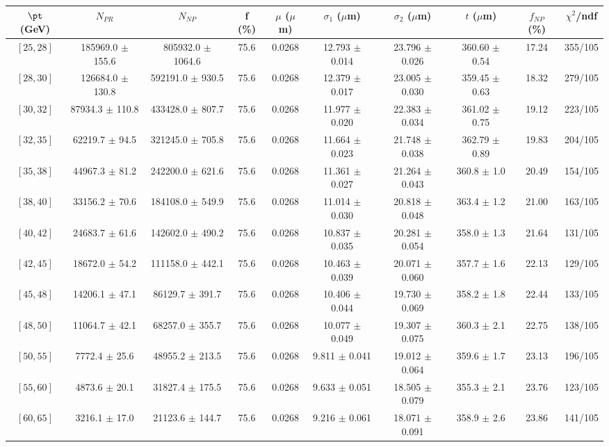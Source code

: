 \begin{tabular}{c||c|c|c|c|c|c|c||c|c}
$\pt$ (GeV) & $N_{PR}$ & $N_{NP}$ & f (\%) & $\mu$ ($\mu$m) & $\sigma_1$ ($\mu$m) & $\sigma_2$ ($\mu$m)  & $t$ ($\mu$m) & $f_{NP}$ (\%) & $\chi^2$/ndf \\
\hline
$[25, 28]$ & 185969.0 $\pm$ 155.6 & 805932.0 $\pm$ 1064.6 & 75.6 & 0.0268 & 12.793 $\pm$ 0.014 & 23.796 $\pm$ 0.026 & 360.60 $\pm$ 0.54 & 17.24 & 355/105\\
$[28, 30]$ & 126684.0 $\pm$ 130.8 & 592191.0 $\pm$ 930.5 & 75.6 & 0.0268 & 12.379 $\pm$ 0.017 & 23.005 $\pm$ 0.030 & 359.45 $\pm$ 0.63 & 18.32 & 279/105\\
$[30, 32]$ & 87934.3 $\pm$ 110.8 & 433428.0 $\pm$ 807.7 & 75.6 & 0.0268 & 11.977 $\pm$ 0.020 & 22.383 $\pm$ 0.034 & 361.02 $\pm$ 0.75 & 19.12 & 223/105\\
$[32, 35]$ & 62219.7 $\pm$ 94.5 & 321245.0 $\pm$ 705.8 & 75.6 & 0.0268 & 11.664 $\pm$ 0.023 & 21.748 $\pm$ 0.038 & 362.79 $\pm$ 0.89 & 19.83 & 204/105\\
$[35, 38]$ & 44967.3 $\pm$ 81.2 & 242200.0 $\pm$ 621.6 & 75.6 & 0.0268 & 11.361 $\pm$ 0.027 & 21.264 $\pm$ 0.043 & 360.8 $\pm$ 1.0 & 20.49 & 154/105\\
$[38, 40]$ & 33156.2 $\pm$ 70.6 & 184108.0 $\pm$ 549.9 & 75.6 & 0.0268 & 11.014 $\pm$ 0.030 & 20.818 $\pm$ 0.048 & 363.4 $\pm$ 1.2 & 21.00 & 163/105\\
$[40, 42]$ & 24683.7 $\pm$ 61.6 & 142602.0 $\pm$ 490.2 & 75.6 & 0.0268 & 10.837 $\pm$ 0.035 & 20.281 $\pm$ 0.054 & 358.0 $\pm$ 1.3 & 21.64 & 131/105\\
$[42, 45]$ & 18672.0 $\pm$ 54.2 & 111158.0 $\pm$ 442.1 & 75.6 & 0.0268 & 10.463 $\pm$ 0.039 & 20.071 $\pm$ 0.060 & 357.7 $\pm$ 1.6 & 22.13 & 129/105\\
$[45, 48]$ & 14206.1 $\pm$ 47.1 & 86129.7 $\pm$ 391.7 & 75.6 & 0.0268 & 10.406 $\pm$ 0.044 & 19.730 $\pm$ 0.069 & 358.2 $\pm$ 1.8 & 22.44 & 133/105\\
$[48, 50]$ & 11064.7 $\pm$ 42.1 & 68257.0 $\pm$ 355.7 & 75.6 & 0.0268 & 10.077 $\pm$ 0.049 & 19.307 $\pm$ 0.075 & 360.3 $\pm$ 2.1 & 22.75 & 138/105\\
$[50, 55]$ & 7772.4 $\pm$ 25.6 & 48955.2 $\pm$ 213.5 & 75.6 & 0.0268 & 9.811 $\pm$ 0.041 & 19.012 $\pm$ 0.064 & 359.6 $\pm$ 1.7 & 23.13 & 196/105\\
$[55, 60]$ & 4873.6 $\pm$ 20.1 & 31827.4 $\pm$ 175.5 & 75.6 & 0.0268 & 9.633 $\pm$ 0.051 & 18.505 $\pm$ 0.079 & 355.3 $\pm$ 2.1 & 23.76 & 123/105\\
$[60, 65]$ & 3216.1 $\pm$ 17.0 & 21123.6 $\pm$ 144.7 & 75.6 & 0.0268 & 9.216 $\pm$ 0.061 & 18.071 $\pm$ 0.091 & 358.9 $\pm$ 2.6 & 23.86 & 141/105\\

\end{tabular}
